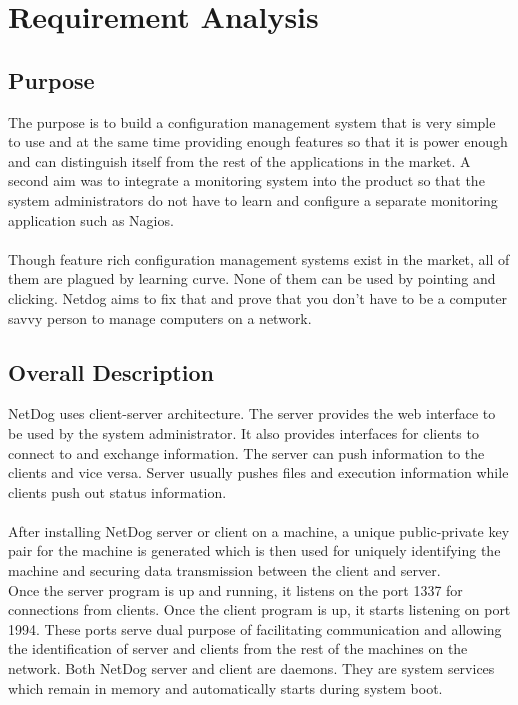 \chapter{Requirement Analysis}

\section{Purpose}

The purpose is to build a configuration management system that is very simple to
use and at the same time providing enough features so that it is power enough
and can distinguish itself from the rest of the applications in the market. A
second aim was to integrate a monitoring system into the product so that the
system administrators do not have to learn and configure a separate monitoring
application such as Nagios.
\\\\
Though feature rich configuration management systems exist in the market, all of
them are plagued by learning curve. None of them can be used by pointing and
clicking. Netdog aims to fix that and prove that you don't have to be a computer
savvy person to manage computers on a network.

\section{Overall Description}

NetDog uses client-server architecture. The server provides the web interface to
be used by the system administrator. It also provides interfaces for clients to
connect to and exchange information. The server can push information to the
clients and vice versa. Server usually pushes files and execution information
while clients push out status information.
\\\\
After installing NetDog server or client on a machine, a unique public-private
key pair for the machine is generated which is then used for uniquely
identifying the machine and securing data transmission between the client and
server.\\

Once the server program is up and running, it listens on the port 1337 for
connections from clients. Once the client program is up, it starts listening on
port 1994. These ports serve dual purpose of facilitating communication and
allowing the identification of server and clients from the rest of the machines
on the network. Both NetDog server and client are daemons. They are system 
services which remain in memory and automatically starts during system boot.\\

